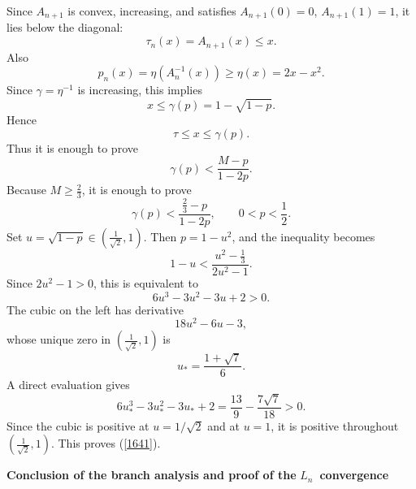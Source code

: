 \documentclass[onecolumn]{article}
\begin{document}
Since $A_{n+1}$ is convex, increasing, and satisfies $A_{n+1}(0)=0$, $%
A_{n+1}(1)=1$, it lies below the diagonal: 
\begin{equation}
\tau _{n}(x)=A_{n+1}(x)\leq x.  \label{1673}
\end{equation}%
Also 
\begin{equation}
p_{n}(x)=\eta (A_{n}^{-1}(x))\geq \eta (x)=2x-x^{2}.  \label{1674}
\end{equation}%
Since $\gamma =\eta ^{-1}$ is increasing, this implies 
\begin{equation}
x\leq \gamma (p)=1-\sqrt{1-p}.  \label{1675}
\end{equation}%
Hence 
\begin{equation}
\tau \leq x\leq \gamma (p).  \label{1676}
\end{equation}%
Thus it is enough to prove 
\begin{equation}
\gamma (p)<\frac{M-p}{1-2p}.  \label{1677}
\end{equation}%
Because $M\geq \frac{2}{3}$, it is enough to prove 
\begin{equation}
\gamma (p)<\frac{\frac{2}{3}-p}{1-2p},\qquad 0<p<\frac{1}{2}.  \label{1678}
\end{equation}%
Set $u=\sqrt{1-p}\in \left( \frac{1}{\sqrt{2}},1\right) $. Then $p=1-u^{2}$,
and the inequality becomes 
\begin{equation}
1-u<\frac{u^{2}-\frac{1}{3}}{2u^{2}-1}.  \label{1679}
\end{equation}%
Since $2u^{2}-1>0$, this is equivalent to 
\begin{equation}
6u^{3}-3u^{2}-3u+2>0.  \label{1680}
\end{equation}%
The cubic on the left has derivative 
\begin{equation}
18u^{2}-6u-3,  \label{1681}
\end{equation}%
whose unique zero in $\left( \frac{1}{\sqrt{2}},1\right) $ is 
\begin{equation}
u_{\ast }=\frac{1+\sqrt{7}}{6}.  \label{1682}
\end{equation}%
A direct evaluation gives 
\begin{equation}
6u_{\ast }^{3}-3u_{\ast }^{2}-3u_{\ast }+2=\frac{13}{9}-\frac{7\sqrt{7}}{18}%
>0.  \label{1683}
\end{equation}%
Since the cubic is positive at $u=1/\sqrt{2}$ and at $u=1$, it is positive
throughout $\left( \frac{1}{\sqrt{2}},1\right) $. This proves (\ref{1641}).

\begin{flushleft}
\textbf{Conclusion of the branch analysis and proof of the }$L_{n}$\textbf{\
convergence}
\end{flushleft}
\end{document}
